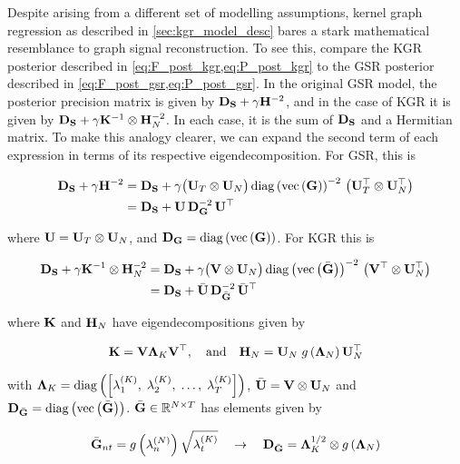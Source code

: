 Despite arising from a different set of modelling assumptions, kernel graph regression as described in \cref{sec:kgr_model_desc} bares a stark mathematical resemblance to graph signal reconstruction.  To see this, compare the KGR posterior described in \cref{eq:F_post_kgr,eq:P_post_kgr} to the GSR posterior described in \cref{eq:F_post_gsr,eq:P_post_gsr}. In the original GSR model, the posterior precision matrix is given by $\mathbf{D}_{\mathbf{S}} + \gamma \mathbf{H}^{-2}$, and in the case of KGR it is given by $\mathbf{D}_{\mathbf{S}} + \gamma \mathbf{K}^{-1} \otimes \mathbf{H}_N^{-2}$. In each case, it is the sum of $\mathbf{D}_{\mathbf{S}}$ and a Hermitian matrix. To make this analogy clearer, we can expand the second term of each expression in terms of its respective eigendecomposition. For GSR, this is

\begin{align*}
    \mathbf{D}_{\mathbf{S}} + \gamma \mathbf{H}^{-2} &= \mathbf{D}_{\mathbf{S}} + \gamma \big(\mathbf{U}_T \otimes \mathbf{U}_N \big) \, \text{\textup{diag}}\left(\text{\textup{vec}}\left(\mathbf{G}\right)\right)^{-2} \, \big(\mathbf{U}_T^\top \otimes \mathbf{U}_N^\top \big) \\
    &= \mathbf{D}_{\mathbf{S}} + \mathbf{U} \, \mathbf{D}_{\mathbf{G}}^{-2} \, \mathbf{U}^\top
\end{align*}

where $\mathbf{U} = \mathbf{U}_T \otimes \mathbf{U}_N $, and $\mathbf{D}_{\mathbf{G}} = \text{\textup{diag}}\left(\text{\textup{vec}}\left(\mathbf{G}\right)\right)$. For KGR this is

\begin{align*}
    \mathbf{D}_{\mathbf{S}} + \gamma \mathbf{K}^{-1} \otimes \mathbf{H}_N^{-2} &= \mathbf{D}_{\mathbf{S}} + \gamma \big(\mathbf{V} \otimes \mathbf{U}_N \big) \, \text{\textup{diag}}\left(\text{\textup{vec}}\left(\bar{\mathbf{G}}\right)\right)^{-2} \, \big(\mathbf{V}^\top \otimes \mathbf{U}_N^\top \big) \\
    &= \mathbf{D}_{\mathbf{S}} + \bar{\mathbf{U}} \, \mathbf{D}_{\bar{\mathbf{G}}}^{-2} \, \bar{\mathbf{U}}^\top
\end{align*}

where $\mathbf{K}$ and $\mathbf{H}_N$ have eigendecompositions given by 

\begin{equation}
    \mathbf{K} = \mathbf{V} \mathbf{\Lambda}_K \mathbf{V}^\top, \quad \text{and} \quad \mathbf{H}_N = \mathbf{U}_N \; g\left(\mathbf{\Lambda}_N\right)  \mathbf{U}_N^\top
\end{equation}

with $\mathbf{\Lambda}_K = \text{\textup{diag}}\left(\left[\lambda^{(K)}_1, \; \lambda^{(K)}_2, \; \dots, \;\lambda^{(K)}_T \right]\right)$, $\bar{\mathbf{U}} = \mathbf{V} \otimes \mathbf{U}_N$ and $\mathbf{D}_{\bar{\mathbf{G}}} = \text{\textup{diag}}\left(\text{\textup{vec}}\left(\bar{\mathbf{G}}\right)\right)$. $\bar{\mathbf{G}} \in \mathbb{R}^{N \times T}$ has elements given by

\begin{equation}
    \bar{\mathbf{G}}_{nt} = g\left(\lambda^{(N)}_n\right) \sqrt{\lambda^{(K)}_t} \quad \rightarrow \quad \mathbf{D}_{\bar{\mathbf{G}}} = \mathbf{\Lambda}_K^{1/2} \otimes g\left(\mathbf{\Lambda}_N\right) 
\end{equation}



